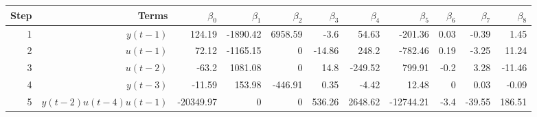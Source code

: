 \begin{tabular}{rrrrrrrrrrr}
Step & Terms & $\beta_{0}$ & $\beta_{1}$ & $\beta_{2}$ & $\beta_{3}$ & $\beta_{4}$ & $\beta_{5}$ & $\beta_{6}$ & $\beta_{7}$ & $\beta_{8}$ \\ 
\hline 
1 & $y(t-1)$ & 124.19 & -1890.42 & 6958.59 & -3.6 & 54.63 & -201.36 & 0.03 & -0.39 & 1.45 \\ 
2 & $u(t-1)$ & 72.12 & -1165.15 & 0 & -14.86 & 248.2 & -782.46 & 0.19 & -3.25 & 11.24 \\ 
3 & $u(t-2)$ & -63.2 & 1081.08 & 0 & 14.8 & -249.52 & 799.91 & -0.2 & 3.28 & -11.46 \\ 
4 & $y(t-3)$ & -11.59 & 153.98 & -446.91 & 0.35 & -4.42 & 12.48 & 0 & 0.03 & -0.09 \\ 
5 & $y(t-2)u(t-4)u(t-1)$ & -20349.97 & 0 & 0 & 536.26 & 2648.62 & -12744.21 & -3.4 & -39.55 & 186.51 \\ 
\hline 
\end{tabular}